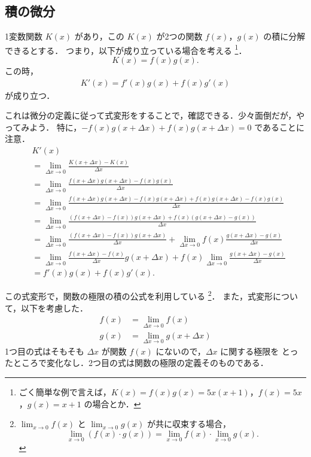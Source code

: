 \subsection{積の微分}
    1変数関数 $K(x)$ があり，この $K(x)$ が2つの関数 $f(x)$，$g(x)$ の積に分解できるとする．
    つまり，以下が成り立っている場合を考える
        \footnote{
            ごく簡単な例で言えば，$K(x)=f(x)g(x)=5x(x+1)$，$f(x)=5x$，$g(x)=x+1$ の場合とか．
        }．
        \begin{equation*}
            K(x) = f(x)g(x).
        \end{equation*}
     この時，
         \begin{align}
             K'(x) = f'(x)g(x) + f(x)g'(x)
         \end{align}
     が成り立つ．

    これは微分の定義に従って式変形をすることで，確認できる．少々面倒だが，やってみよう．
    特に，$-f(x)g(x+\Delta x) + f(x)g(x+\Delta x) = 0$ であることに注意．
        \begin{align*}
            &K'(x) \\
            &= \lim_{\Delta x \to 0}
               \frac{K(x+\Delta x)-K(x)}{\Delta x} \\
            &= \lim_{\Delta x \to 0}
               \frac{f(x+\Delta x)g(x+\Delta x)-f(x)g(x)}{\Delta x} \\
            &= \lim_{\Delta x \to 0}
               \frac{f(x+\Delta x)g(x+\Delta x)-f(x)g(x+\Delta x) + f(x)g(x+\Delta x)-f(x)g(x)}{\Delta x} \\
            &= \lim_{\Delta x \to 0}
               \frac{\left(f(x+\Delta x)-f(x)\right)g(x+\Delta x) + f(x)\left(g(x+\Delta x)-g(x)\right)}{\Delta x} \\
            &= \lim_{\Delta x \to 0} \frac{\left(f(x+\Delta x)-f(x)\right)g(x+\Delta x)}{\Delta x}
             + \lim_{\Delta x \to 0} f(x)\frac{g(x+\Delta x)-g(x)}{\Delta x} \\
            &= \lim_{\Delta x \to 0} \frac{f(x+\Delta x)-f(x)}{\Delta x} g(x+\Delta x)
             + f(x) \lim_{\Delta x \to 0} \frac{g(x+\Delta x)-g(x)}{\Delta x} \\
            &= f'(x)g(x) + f(x)g'(x).
        \end{align*}

    この式変形で，関数の極限の積の公式を利用している
        \footnote{
            $\displaystyle\lim_{x \to 0}f(x)$ と $\displaystyle\lim_{x \to 0}g(x)$ が共に収束する場合，
            \begin{equation*}
                \lim_{x \to 0}(f(x) \cdot g(x)) = \lim_{x \to 0}f(x) \cdot \lim_{x \to 0}g(x).
            \end{equation*}
        }．
    また，式変形について，以下を考慮した．
        \begin{align*}
            f(x) &= \lim_{\Delta x \to 0} f(x) \\
            g(x) &= \lim_{\Delta x \to 0} g(x+\Delta x)
        \end{align*}
    1つ目の式はそもそも $\Delta x$ が関数 $f(x)$ にないので，$\Delta x$ に関する極限を
    とったところで変化なし．2つ目の式は関数の極限の定義そのものである．

